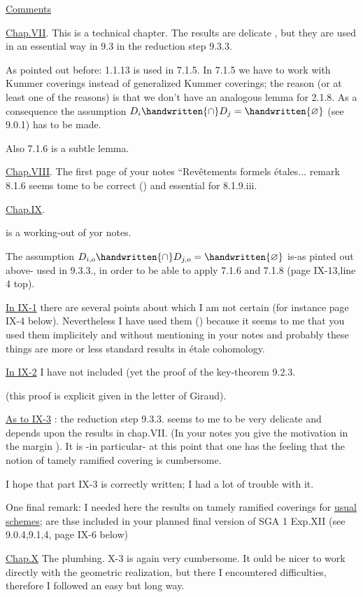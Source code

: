 
\uline{Comments}

\uline{Chap.VII}. This is a technical chapter. The results are delicate , but they are used in an essential way in 9.3 in the reduction step 9.3.3.

As pointed out before: 1.1.13 is used in 7.1.5. In 7.1.5 we have to work with Kummer coverings instead of generalized Kummer coverings; the reason (or at least one of the reasons) is that we don't have an analogous lemma for 2.1.8. As a consequence the assumption $D_i\handwritten{\cap}D_j=\handwritten{\varnothing}$ (see 9.0.1) has to be made.

Also 7.1.6 is a subtle lemma.

\uline{Chap.VIII}. The first page of your notes ``Revêtements formels étales... remark 8.1.6 seems tome to be correct (\handwritten{!}) and essential for 8.1.9.iii.

\uline{Chap.IX}.

 is a working-out of yor notes.

The assumption $D_{i,o}\handwritten{\cap}D_{j,o}=\handwritten{\varnothing}$ is-as pinted out above- used in 9.3.3., in order to be able to apply 7.1.6 and 7.1.8 (page IX-13,line 4 top).

\uline{In IX-1} there are several points about which I am not certain (for instance page IX-4 below). Nevertheless I have used them (\handwritten{!}) because it seems to me that you used them implicitely and without mentioning in your notes and probably these things are more or less standard results in étale cohomology.

\uline{In IX-2} I have not included (yet the proof of the key-theorem 9.2.3.

(this proof is explicit given in the letter of Giraud).

\uline{As to IX-3} : the reduction step 9.3.3. seems to me to be very delicate and depends upon the results in chap.VII. (In your notes you give the motivation in the margin \handwritten{!}). It is -in particular- at this point that one has the feeling that the notion of tamely ramified covering is cumbersome.

I hope that part IX-3 is correctly written; I had a lot of trouble with it.

One final remark: I needed here the results on tamely ramified coverings for \uline{usual schemes}; are thse included in your planned final version of SGA 1 Exp.XII (see 9.0.4,9.1,4, page IX-6 below)

\uline{Chap.X} The plumbing. X-3 is again very cumbersome. It ould be nicer to work directly with the geometric realization, but there I encountered difficulties, therefore I followed an easy but long way.

